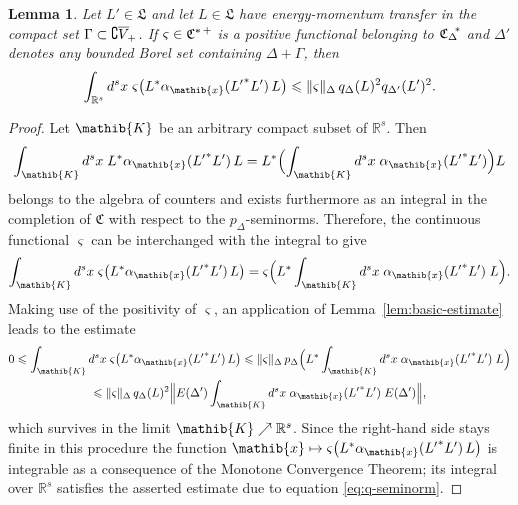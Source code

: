 \documentclass[a4paper,a4paper]{article}
\numberwithin{equation}{section}
\newcommand{\Cfrak}{\mathfrak{C}}
\newcommand{\Lfrak}{\mathfrak{L}}
\newcommand{\Kib}{\mathib{K}}
\newcommand{\xib}{\mathib{x}}
\newcommand{\Rs}{\mathbb{R}^s}
\newcommand{\fwcone}{\overline{V}_{\negthinspace +}}
\newcommand{\EDprime}{E ( \Delta' )}
\newcommand{\Cstarplus}{\mathfrak{C}^{* \thinspace +}}
\newcommand{\CDstar}{{\mathfrak{C}_\Delta}^{\negthickspace *}}
\newcommand{\aibx}{\alpha_\mathib{x}}
\theoremstyle{definition}
\theoremstyle{plain}
\newtheorem{lemma}[definition]{Lemma}
\theoremstyle{remark}
\newcommand{\norm}[1]{\lVert #1 \rVert}
\newcommand{\Bnorm}[1]{\Bigl\lVert #1 \Bigr\rVert}
\newcommand{\pD}{p_\Delta}
\newcommand{\BpDx}[1]{p_\Delta \Bigl( #1 \Bigr)}
\newcommand{\qDx}[1]{q_\Delta ( #1 )}
\newcommand{\qDprimex}[1]{q_{\Delta'} ( #1 )}
\begin{document}
  \begin{lemma}
    \label{lem:cluster-prep}
    Let $L' \in \Lfrak$ and let $L \in \Lfrak$ have energy-momentum
    transfer in the compact set $\Gamma \subset \complement \fwcone$.
    If $\varsigma \in \Cstarplus$ is a positive functional belonging
    to $\CDstar$ and $\Delta'$ denotes any bounded Borel set
    containing $\Delta + \Gamma$, then
    \begin{equation}
      \label{eq:varsigmaintegral-prep}
      \int_{\Rs} d^s x \; \varsigma \bigl( L^* \aibx ( {L'}^* L' ) \,
      L \bigr) \leqslant \norm{\varsigma}_\Delta \, \qDx{L}^2
      \qDprimex{L'}^2 \text{.}
    \end{equation}
  \end{lemma}
  \begin{proof}
    Let $\Kib$ be an arbitrary compact subset of $\Rs$. Then
    \begin{equation*}
      \int_\Kib d^s x \; L^* \aibx ( {L'}^* L' ) \, L = L^* \Bigl(
      \int_\Kib d^s x \; \aibx ( {L'}^* L' ) \Bigr) L
    \end{equation*}
    belongs to the algebra of counters and exists furthermore as an
    integral in the completion of $\Cfrak$ with respect to the
    $\pD$-seminorms. Therefore, the continuous functional $\varsigma$
    can be interchanged with the integral
    \cite[Proposition~II.5.7]{fell/doran:1988a} to give
    \begin{equation*}
      \int_\Kib d^s x \; \varsigma \bigl( L^* \aibx ( {L'}^* L' ) \, L
      \bigr) = \varsigma \Bigl( L^* \int_\Kib d^s x \; \aibx ( {L'}^*
      L' ) \; L \Bigr) \text{.}
    \end{equation*}
    Making use of the positivity of $\varsigma$, an application of
    Lemma~\ref{lem:basic-estimate} leads to the estimate
    \begin{multline*}
      0 \leqslant \int_\Kib d^s x \; \varsigma \bigl( L^* \aibx (
      {L'}^* L' ) \, L \bigr) \leqslant \norm{\varsigma}_\Delta \,
      \BpDx{L^* \int_\Kib d^s x \; \aibx ( {L'}^* L' ) \; L} \\
      \leqslant \norm{\varsigma}_\Delta \, \qDx{L}^2 \Bnorm{\EDprime
      \int_\Kib d^s x \; \aibx ( {L'}^* L' ) \; \EDprime} \text{,}
    \end{multline*}
    which survives in the limit $\Kib \nearrow \Rs$. Since the
    right-hand side stays finite in this procedure the function $\xib
    \mapsto \varsigma \bigl( L^* \aibx ( {L'}^* L' ) \, L \bigr)$ is
    integrable as a consequence of the Monotone Convergence
    Theorem; its integral over $\Rs$ satisfies the asserted estimate
    due to equation \eqref{eq:q-seminorm}.
  \end{proof}
\end{document}

